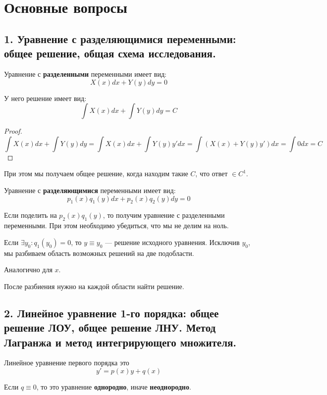 

\cfoot{}

\usepackage{graphicx}



\section*{Основные вопросы}

\subsection*{1. Уравнение с разделяющимися переменными: общее решение, общая схема исследования.}

Уравнение с \textbf{разделенными} переменными имеет вид:
\[X(x)dx + Y(y)dy = 0\]

У него решение имеет вид:
\[\int X(x) dx + \int Y(y)dy = C\]

\begin{proof}
    \[\int X(x) dx + \int Y(y)dy = \int X(x) dx + \int Y(y)y' dx = \int (X(x) + Y(y)y')dx = \int 0dx = C\]
\end{proof}

При этом мы получаем общее решение, когда находим такие \(C\), что ответ \(\in C^1\).

Уравнение с \textbf{разделяющимися} переменными имеет вид:
\[p_1(x)q_1(y)dx + p_2(x)q_2(y)dy = 0\]

Если поделить на \(p_2(x)q_1(y)\), то получим уравнение с разделенными переменными. При этом необходимо убедиться, что мы не делим на ноль.

Если \(\exists y_0 : q_1(y_0) = 0\), то \(y\equiv y_0\) --- решение исходного уравнения. Исключив \(y_0\), мы разбиваем область возможных решений на две подобласти.

Аналогично для \(x\).

После разбиения нужно на каждой области найти решение.

\subsection*{2. Линейное уравнение 1-го порядка: общее решение ЛОУ, общее решение ЛНУ. Метод Лагранжа и метод интегрирующего множителя.}

Линейное уравнение первого порядка это
\[y' = p(x)y + q(x)\]

Если \(q\equiv 0\), то это уравнение \textbf{однородно}, иначе \textbf{неоднородно}.

